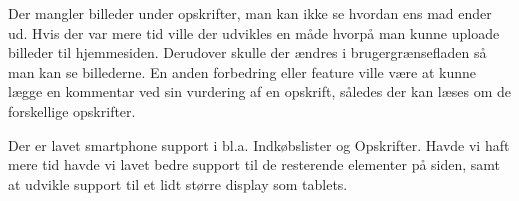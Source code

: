 Der mangler billeder under opskrifter, man kan ikke se hvordan ens mad ender ud.
Hvis der var mere tid ville der udvikles en måde hvorpå man kunne uploade billeder til hjemmesiden. 
Derudover skulle der ændres i brugergrænsefladen så man kan se billederne.
En anden forbedring eller feature ville være at kunne lægge en kommentar ved sin vurdering af en opskrift, således der kan læses om de forskellige opskrifter. 

Der er lavet smartphone support i bl.a. Indkøbslister og Opskrifter.
Havde vi haft mere tid havde vi lavet bedre support til de resterende elementer på siden, samt at udvikle support til et lidt større display som tablets.

